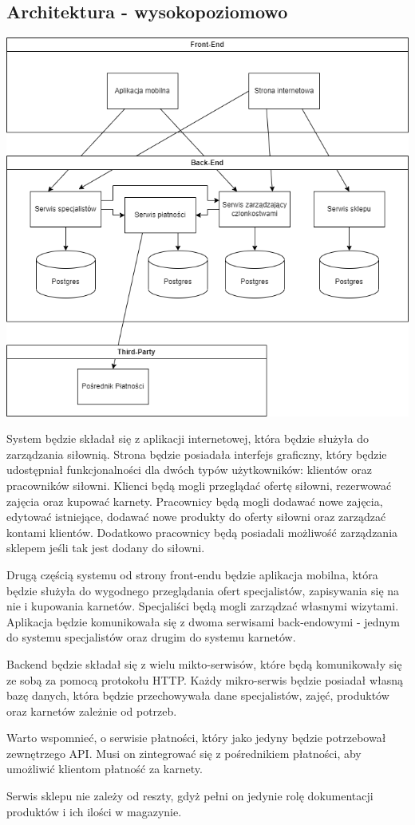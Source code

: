 \subsection{Architektura - wysokopoziomowo}\label{subsec:architektura-wysokopoziomowo}

\includegraphics{../diagrams/architecture/high_level_architecture}

{System będzie składał się z aplikacji internetowej, która będzie służyła do zarządzania
siłownią. Strona będzie posiadała interfejs graficzny, który będzie
udostępniał funkcjonalności dla dwóch typów użytkowników: klientów oraz
pracowników siłowni. Klienci będą mogli przeglądać ofertę siłowni,
rezerwować zajęcia oraz kupować karnety. Pracownicy będą mogli dodawać
nowe zajęcia, edytować istniejące, dodawać nowe produkty do oferty
siłowni oraz zarządzać kontami klientów. Dodatkowo pracownicy będą posiadali możliwość
zarządzania sklepem jeśli tak jest dodany do siłowni.}

{Drugą częścią systemu od strony front-endu będzie aplikacja mobilna, która będzie służyła do wygodnego
przeglądania ofert specjalistów, zapisywania się na nie i kupowania karnetów. Specjaliści będą mogli
zarządzać własnymi wizytami.
Aplikacja będzie komunikowała się z dwoma serwisami back-endowymi - jednym do systemu specjalistów
oraz drugim do systemu karnetów.}

{Backend będzie składał się z wielu mikto-serwisów, które będą
komunikowały się ze sobą za pomocą protokołu HTTP. Każdy mikro-serwis
będzie posiadał własną bazę danych, która będzie przechowywała dane
specjalistów, zajęć, produktów oraz karnetów zależnie od potrzeb.}

{Warto wspomnieć, o serwisie płatności, który jako jedyny będzie potrzebował zewnętrzego API.
Musi on zintegrować się z pośrednikiem płatności, aby umożliwić klientom płatność za karnety.}

{Serwis sklepu nie zależy od reszty, gdyż pełni on jedynie rolę dokumentacji produktów i ich
ilości w magazynie.}

